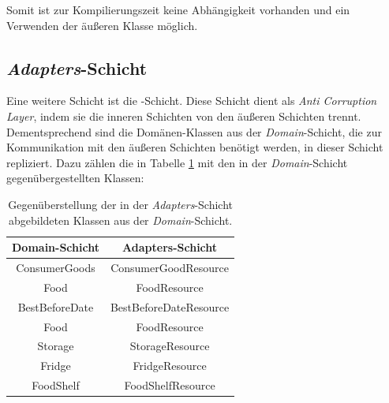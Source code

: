 Somit ist zur Kompilierungszeit keine Abhängigkeit vorhanden und ein Verwenden der äußeren Klasse möglich.


\subsection*{\textit{Adapters}-Schicht}
Eine weitere Schicht ist die \href{https://github.com/lucasmerkel/dhbw-advancedswe-programmentwurf/tree/main/swe_programmentwurf/consumergoods-inventory-planner/1-cip-adapters}{}-Schicht.
Diese Schicht dient als \textit{Anti Corruption Layer}, indem sie die inneren Schichten von den äußeren Schichten trennt.
Dementsprechend sind die Domänen-Klassen aus der \textit{Domain}-Schicht, die zur Kommunikation mit den äußeren Schichten benötigt werden, in dieser Schicht repliziert.
Dazu zählen die in Tabelle \ref{clean-architecture>klassen-adapters} mit den in der \textit{Domain}-Schicht gegenübergestellten Klassen:

\begin{table}[H]
    \centering
\begin{tabular}[h]{|c|c|}
	\hline
	\textbf{Domain-Schicht} & \textbf{Adapters-Schicht} \\
	\hline
	ConsumerGoods & ConsumerGoodResource \\
	\hline
	Food & FoodResource \\
	\hline
	BestBeforeDate & BestBeforeDateResource \\
	\hline
	Food & FoodResource \\
	\hline
	Storage & StorageResource \\
	\hline
	Fridge & FridgeResource \\
	\hline
	FoodShelf & FoodShelfResource \\
    \hline
\end{tabular}
    \caption{Gegenüberstellung der in der \textit{Adapters}-Schicht abgebildeten Klassen aus der \textit{Domain}-Schicht.}
    \label{clean-architecture>klassen-adapters}
\end{table}

